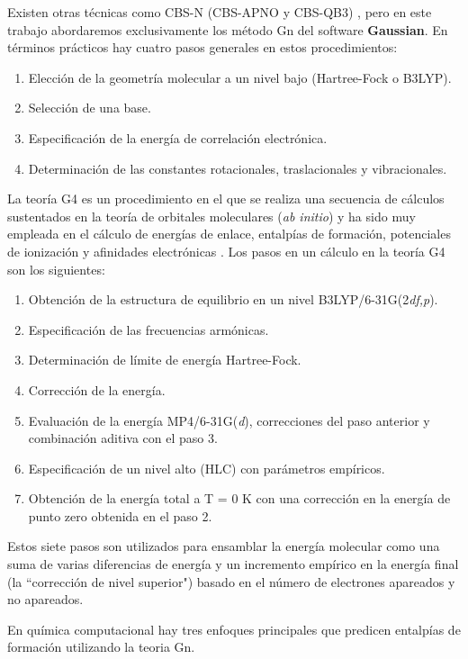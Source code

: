 \documentclass[12pt]{article}
\begin{document}
Existen otras técnicas como CBS-N (CBS-APNO y CBS-QB3) \cite{Simmie2015}, pero en este trabajo abordaremos exclusivamente los método Gn del software \textbf{Gaussian}. En términos prácticos hay cuatro pasos generales en estos procedimientos:
\begin{enumerate}
        \item Elección de la geometría molecular a un nivel bajo (Hartree-Fock o B3LYP).
        \item Selección de una base.
        \item Especificación de la energía de correlación electrónica.
        \item Determinación de las constantes rotacionales, traslacionales y vibracionales.
\end{enumerate}
La teoría G4 es un procedimiento en el que se realiza una secuencia de cálculos sustentados en la teoría de orbitales moleculares  (\textit{ab initio}) y ha sido muy empleada en el cálculo de energías de enlace, entalpías de formación, potenciales de ionización y afinidades electrónicas \cite{Cuevas2003, Tajti2004}. Los pasos en un cálculo en la teoría G4 son los siguientes:
\begin{enumerate}
        \item Obtención de la estructura de equilibrio en un nivel B3LYP/6-31G(2\textit{df,p}).
        \item Especificación de las frecuencias armónicas.
        \item Determinación de límite de energía Hartree-Fock.
        \item Corrección de la energía.
        \item Evaluación de la energía MP4/6-31G(\textit{d}), correcciones del paso anterior y combinación aditiva con el paso 3.
        \item Especificación de un nivel alto (HLC) con parámetros empíricos.
        \item Obtención de la energía total a T = 0 K con una corrección en la energía de punto zero obtenida en el paso 2.
\end{enumerate}

Estos siete pasos son utilizados para ensamblar la energía molecular como una suma de varias diferencias de energía y un incremento empírico en la energía final (la ``corrección de nivel superior") basado en el número de electrones apareados y no apareados\cite{Curtiss2007}.

En química computacional hay tres enfoques principales que predicen entalpías de formación utilizando la teoria Gn.
\end{document}
